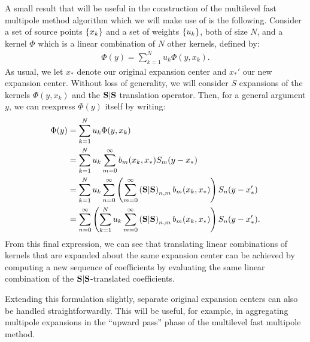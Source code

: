 A small result that will be useful in the construction of the
multilevel fast multipole method algorithm which we will make use of
is the following. Consider a set of source points $\left\{x_k\right\}$
and a set of weights $\left\{u_k\right\}$,
both of size $N$,
and a kernel $\Phi$
which is a linear combination of $N$ other kernels, defined by:
\begin{align*}
  \Phi(y) = \sum_{k=1}^N u_k \Phi(y, x_k).
\end{align*}
As usual, we let $x_*$
denote our original expansion center and $x_*'$
our new expansion center. Without loss of generality, we will consider
$S$
expansions of the kernels $\Phi(y, x_k)$
and the $\bold{S}|\bold{S}$
translation operator. Then, for a general argument $y$,
we can reexpress $\Phi(y)$ itself by writing:
\begin{align*}
  \Phi(y)
  &= \sum_{k=1}^N u_k \Phi(y, x_k) \\
  &= \sum_{k=1}^N u_k \sum_{m=0}^\infty b_m(x_k, x_*) S_m(y - x_*) \\
  &= \sum_{k=1}^N u_k \sum_{n=0}^\infty \left(\sum_{m=0}^\infty \left(\bold{S}|\bold{S}\right)_{n,m} b_m(x_k, x_*)\right) S_n(y - x_*') \\
  &= \sum_{n=0}^\infty \left(\sum_{k=1}^N u_k \sum_{m=0}^\infty \left(\bold{S}|\bold{S}\right)_{n,m} b_m(x_k, x_*)\right) S_n(y - x_*').
\end{align*}
From this final expression, we can see that translating linear
combinations of kernels that are expanded about the same expansion
center can be achieved by computing a new sequence of coefficients by
evaluating the same linear combination of the $\bold{S}|\bold{S}$-translated
coefficients. 

Extending this formulation slightly, separate original expansion
centers can also be handled straightforwardly. This will be useful,
for example, in aggregating multipole expansions in the ``upward
pass'' phase of the multilevel fast multipole method.

